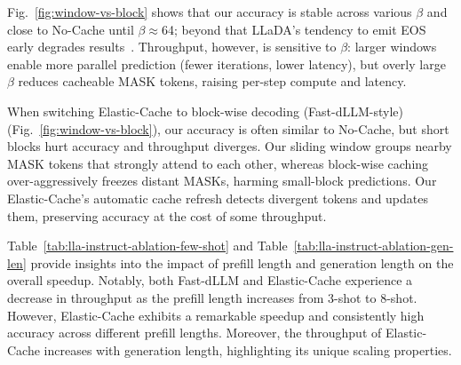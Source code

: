 \documentclass{article} %
\theoremstyle{definition}
\theoremstyle{remark}
\begin{document}
Fig.~\ref{fig:window-vs-block} shows that our accuracy is stable across various $\beta$ and close to No-Cache until $\beta\!\approx$64; beyond that LLaDA's tendency to emit EOS early degrades results~\citep{you2025llada}. Throughput, however, is sensitive to $\beta$: larger windows enable more parallel prediction (fewer iterations, lower latency), but overly large $\beta$ reduces cacheable MASK tokens, raising per-step compute and latency.

 When switching Elastic-Cache to block-wise decoding (Fast-dLLM-style) (Fig.~\ref{fig:window-vs-block}), our accuracy is often similar to No-Cache, but short blocks hurt accuracy and throughput diverges. Our sliding window groups nearby MASK tokens that strongly attend to each other, whereas block-wise caching over-aggressively freezes distant MASKs, harming small-block predictions. Our Elastic-Cache's automatic cache refresh detects divergent tokens and updates them, preserving accuracy at the cost of some throughput.

 Table~\ref{tab:lla-instruct-ablation-few-shot} and Table~\ref{tab:lla-instruct-ablation-gen-len} provide insights into the impact of prefill length and generation length on the overall speedup. Notably, both Fast-dLLM and Elastic-Cache experience a decrease in throughput as the prefill length increases from 3-shot to 8-shot. However, Elastic-Cache exhibits a remarkable speedup and consistently high accuracy across different prefill lengths. Moreover, the throughput of Elastic-Cache increases with generation length, highlighting its unique scaling properties. 
\end{document}
